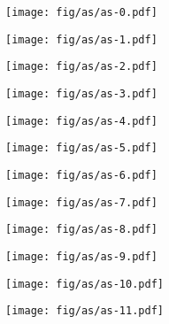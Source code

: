 \documentclass{beamer}
\begin{document}
\begin{frame}
\begin{columns}[t]
  \begin{column}{6cm}
    \vspace{-0.8cm}     
    {
      \begin{figure}[h!]
        \centering
        \texttt{[image: fig/as/as-0.pdf]}
      \end{figure}
    }
    {
      \begin{figure}[h!]
        \centering
        \texttt{[image: fig/as/as-1.pdf]}
      \end{figure}
    }
    {
      \begin{figure}[h!]
        \centering
        \texttt{[image: fig/as/as-2.pdf]}
      \end{figure}
    }
    {
      \begin{figure}[h!]
        \centering
        \texttt{[image: fig/as/as-3.pdf]}
      \end{figure}
    }
    {
      \begin{figure}[h!]
        \centering
        \texttt{[image: fig/as/as-4.pdf]}
      \end{figure}
    }
    {
      \begin{figure}[h!]
        \centering
        \texttt{[image: fig/as/as-5.pdf]}
      \end{figure}
    }
    {
      \begin{figure}[h!]
        \centering
        \texttt{[image: fig/as/as-6.pdf]}
      \end{figure}
    }
    {
      \begin{figure}[h!]
        \centering
        \texttt{[image: fig/as/as-7.pdf]}
      \end{figure}
    }
    {
      \begin{figure}[h!]
        \centering
        \texttt{[image: fig/as/as-8.pdf]}
      \end{figure}
    }
    {
      \begin{figure}[h!]
        \centering
        \texttt{[image: fig/as/as-9.pdf]}
      \end{figure}
    }
    {
      \begin{figure}[h!]
        \centering
        \texttt{[image: fig/as/as-10.pdf]}
      \end{figure}
    }
    {
      \begin{figure}[h!]
        \centering
        \texttt{[image: fig/as/as-11.pdf]}
      \end{figure}
    }

  \end{column}
\end{columns} 

\end{frame}
\end{document}
